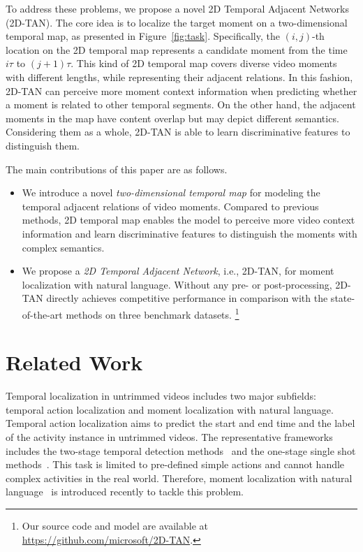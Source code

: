 \documentclass[letterpaper]{article} %
\begin{document}
To address these problems, we propose a novel 2D Temporal Adjacent Networks (2D-TAN). The core idea is to localize the target moment on a two-dimensional temporal map, as presented in Figure~\ref{fig:task}.
Specifically, the $(i,j)$-th location on the 2D temporal map represents a candidate moment  from the time $i\tau$ to $(j+1)\tau$.
This kind of 2D temporal map covers diverse video moments with different lengths, while representing their adjacent relations.
In this fashion, 2D-TAN can perceive more moment context information when predicting whether a moment is related to other temporal segments.
On the other hand, the adjacent moments in the map have content overlap but may depict different semantics. Considering them as a whole, 2D-TAN is able to learn discriminative features to distinguish them.

The main contributions of this paper are as follows.
\begin{itemize}[leftmargin=0.38cm]

\item{We introduce a novel \textit{two-dimensional temporal map} for modeling the temporal adjacent relations of video moments. Compared to previous methods, 2D temporal map enables the model to perceive more video context information and learn discriminative features to distinguish the moments with complex semantics.
}

\item{We propose a \emph{2D Temporal Adjacent Network}, i.e., 2D-TAN, for moment localization with natural language.
Without any pre- or post-processing, 2D-TAN directly achieves competitive performance in comparison with the state-of-the-art methods on three benchmark datasets.
\footnote{Our source code and model are available at \url{https://github.com/microsoft/2D-TAN}.}
}
\end{itemize}

\section{Related Work}

Temporal localization in untrimmed videos includes two major subfields: temporal action localization and moment localization with natural language. Temporal action localization aims to predict the start and end time and the label of the activity instance in untrimmed videos. The representative frameworks includes the two-stage temporal detection methods~\cite{SSN2017ICCV} and the one-stage single shot methods~\cite{lin2017single}.
This task is limited to pre-defined simple actions and cannot handle complex activities in the real world. Therefore, moment localization with natural language~\cite{gao2017tall,hendricks17iccv} is introduced recently to tackle this problem.
\end{document}
